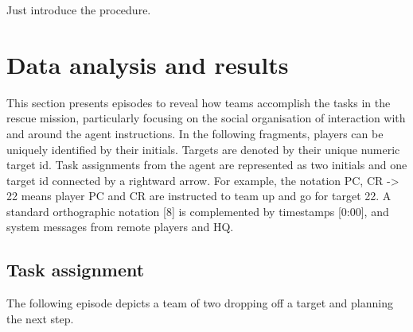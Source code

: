 

Just introduce the procedure.\\

\section{Data analysis and results}

This section presents episodes to reveal how teams accomplish the tasks in the rescue mission, particularly focusing on the social organisation of interaction with and around the agent instructions. In the following fragments, players can be uniquely identified by their initials. Targets are denoted by their unique numeric target id. Task assignments from the agent are represented as two initials and one target id connected by a rightward arrow. For example, the notation PC, CR -> 22 means player PC and CR are instructed to team up and go for target 22. A standard orthographic notation [8] is complemented by timestamps [0:00], and system messages from remote players and HQ.  

\subsection{Task assignment}
The following episode depicts a team of two dropping off a target and planning the next step.\\

